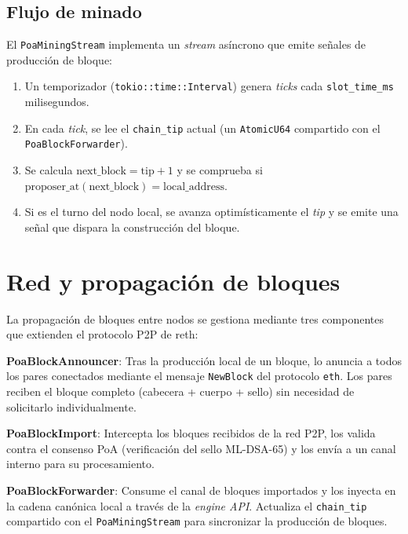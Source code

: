 \subsection{Flujo de minado}

El \texttt{PoaMiningStream} implementa un \emph{stream} asíncrono que emite señales de producción de bloque:

\begin{enumerate}
  \item Un temporizador (\texttt{tokio::time::Interval}) genera \emph{ticks} cada \texttt{slot\_time\_ms} milisegundos.
  \item En cada \emph{tick}, se lee el \texttt{chain\_tip} actual (un \texttt{AtomicU64} compartido con el \texttt{PoaBlockForwarder}).
  \item Se calcula $\text{next\_block} = \text{tip} + 1$ y se comprueba si $\text{proposer\_at}(\text{next\_block}) = \text{local\_address}$.
  \item Si es el turno del nodo local, se avanza optimísticamente el \emph{tip} y se emite una señal que dispara la construcción del bloque.
\end{enumerate}


\section{Red y propagación de bloques}
\label{sec:dev_network}

La propagación de bloques entre nodos se gestiona mediante tres componentes que extienden el protocolo P2P de reth:

\textbf{PoaBlockAnnouncer}: Tras la producción local de un bloque, lo anuncia a todos los pares conectados mediante el mensaje \texttt{NewBlock} del protocolo \texttt{eth}. Los pares reciben el bloque completo (cabecera + cuerpo + sello) sin necesidad de solicitarlo individualmente.

\textbf{PoaBlockImport}: Intercepta los bloques recibidos de la red P2P, los valida contra el consenso PoA (verificación del sello ML-DSA-65) y los envía a un canal interno para su procesamiento.

\textbf{PoaBlockForwarder}: Consume el canal de bloques importados y los inyecta en la cadena canónica local a través de la \emph{engine API}. Actualiza el \texttt{chain\_tip} compartido con el \texttt{PoaMiningStream} para sincronizar la producción de bloques.

